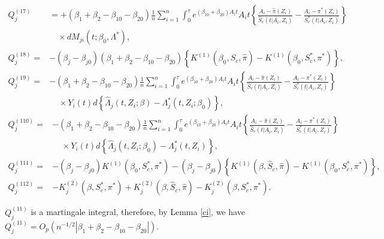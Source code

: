 \documentclass[11pt]{article}
\begin{document}
\begin{newproof7}
\begin{align*}
Q^{(17)}_j&=+(\beta_1+\beta_2-\beta_{10}-\beta_{20})\frac{1}{n}\sum_{i=1}^n\int_0^\tau e^{ (\beta_{10}  + \beta_{20})A_i t}A_i t  \left\{\frac{A_i -\hat \pi( Z_i)}{\hat S_c(t | A_i,Z_i)}-\frac{A_i -\pi^{*}( Z_i)}{S^{*}_c(t | A_i,Z_i)}\right\}
\\ & \quad \times
dM_{ji}(t ; \beta_{0}, \Lambda^{*}),\nonumber\\
Q^{(18)}_j=&-(\beta_j-\beta_{j0})(\beta_1+\beta_2-\beta_{10}-\beta_{20})\left\{K^{(1)}(\beta_0,\hat S_c, \hat \pi)-K^{(1)}(\beta_0,S^{*}_c, \pi^{*})\right\},\\
Q^{(19)}_j=&-(\beta_1+\beta_2-\beta_{10}-\beta_{20})\frac{1}{n}\sum_{i=1}^n\int_0^\tau e^{ (\beta_{10}  + \beta_{20})A_i t}A_i t \left\{\frac{A_i -\hat \pi( Z_i)}{\hat S_c(t | A_i,Z_i)}-\frac{A_i -\pi^{*}( Z_i)}{S^{*}_c(t | A_i,Z_i)}\right\}\\&\;\;\;\;\times Y_i(t)d\left\{\hat \Lambda_j(t,Z_i ; \beta)-\Lambda_j^{*}(t,Z_i; \beta_0)\right\},\nonumber
\end{align*}
\begin{align*}
Q^{(110)}_j=&-(\beta_1+\beta_2-\beta_{10}-\beta_{20})\frac{1}{n}\sum_{i=1}^n\int_0^\tau e^{ (\beta_{10}  + \beta_{20})A_i t}A_i t \left\{\frac{A_i -\hat \pi( Z_i)}{\hat S_c(t | A_i,Z_i)}-\frac{A_i -\pi^{*}( Z_i)}{S^{*}_c(t | A_i,Z_i)}\right\}\\&\;\;\;\;\times Y_i(t)d\left\{\hat \Lambda_j(t,Z_i ; \beta_0)-\Lambda_j^{*}(t,Z_i)\right\},\nonumber\\
Q^{(111)}_j=&-(\beta_j-\beta_{j0})K^{(1)}(\beta_0,S^{*}_c, \pi^{*})-(\beta_j-\beta_{j0})\left\{K^{(1)}(\beta,  \hat S_c, \hat \pi)-K^{(1)}(\beta_0,S^{*}_c, \pi^{*})\right\},\\
Q^{(112)}_j=&-K^{(2)}_j(\beta, S^{*}_c, \pi^{*})+K^{(2)}_j(\beta,\hat S_c, \hat \pi)-K^{(2)}_j(\beta, S^{*}_c, \pi^{*}).
\end{align*}

$Q^{(11)}_j$ is a martingale integral, therefore, by Lemma \ref{ci}, we have $Q^{(11)}_j=O_p(n^{-1/2}|\beta_1+\beta_2-\beta_{10}-\beta_{20}|)$.


\end{newproof7}
\end{document}
